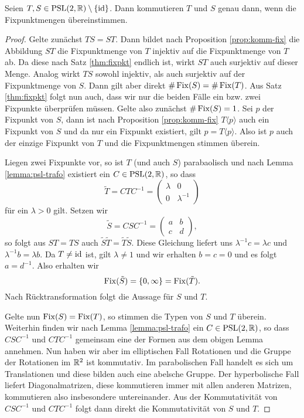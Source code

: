 \begin{thm}
  \label{thm:komm-fix}
  Seien $T,S \in \operatorname{PSL}(2, \mathbb{R})\setminus \{\operatorname{id}\}$. Dann kommutieren $T$ und $S$ genau dann,
  wenn die Fixpunktmengen übereinstimmen.
\end{thm}

\begin{proof}
  Gelte zunächst $TS = ST$. Dann bildet nach Proposition
  \ref{prop:komm-fix} die Abbildung $ST$ die Fixpunktmenge von $T$
  injektiv auf die Fixpunktmenge von $T$ ab. Da diese nach Satz
  \ref{thm:fixpkt} endlich ist, wirkt $ST$ auch surjektiv auf dieser
  Menge. Analog wirkt $TS$ sowohl injektiv, als auch surjektiv auf der
  Fixpunktmenge von $S$. Dann gilt aber direkt $\# \operatorname{Fix}(S) = \#
  \operatorname{Fix}(T)$. Aus Satz \ref{thm:fixpkt} folgt nun auch, dass wir nur die
  beiden Fälle ein bzw. zwei Fixpunkte überprüfen müssen. Gelte also
  zunächst $\# \operatorname{Fix}(S) = 1$. Sei $p$ der Fixpunkt von $S$, dann ist
  nach Proposition \ref{prop:komm-fix} $T\langle p \rangle$ auch ein
  Fixpunkt von $S$ und da nur ein Fixpunkt existiert, gilt $ p = T
  \langle p \rangle$. Also ist $p$ auch der einzige Fixpunkt von $T$
  und die Fixpunktmengen stimmen überein.

  Liegen zwei Fixpunkte vor, so ist $T$ (und auch
  $S$) parabaolisch und nach Lemma \ref{lemma:psl-trafo} existiert ein
  $C \in \operatorname{PSL}(2,\mathbb{R})$, so dass
  \[
  \tilde T = C T C^{-1} =
  \begin{pmatrix}
    \lambda & 0 \\
    0 & \lambda^{-1}
  \end{pmatrix}
  \]
  für ein $\lambda > 0$ gilt. Setzen wir
  \[
  \tilde S = C S C^{-1} =
  \begin{pmatrix}
    a & b \\
    c & d
  \end{pmatrix},
  \]
  so folgt aus $ST = TS$ auch $\tilde S \tilde T = \tilde T \tilde
  S$. Diese Gleichung liefert uns $\lambda^{-1} c = \lambda c$ und
  $\lambda^{-1} b = \lambda b$. Da $T \neq \operatorname{id}$ ist, gilt $\lambda \neq 1$ und
  wir erhalten $b = c = 0$ und es folgt $a = d^{-1}$. Also
  erhalten wir
  \[
  \operatorname{Fix}(\tilde S) = \{0, \infty\} = \operatorname{Fix}(\tilde T).
  \]
  Nach Rücktransformation folgt die Aussage für $S$ und $T$.

  Gelte nun $\operatorname{Fix}(S) = \operatorname{Fix}(T)$, so stimmen die Typen von $S$ und $T$
  überein. Weiterhin finden wir nach Lemma \ref{lemma:psl-trafo} ein $C
  \in \operatorname{PSL}(2, \mathbb{R})$, so dass $C S C^{-1}$ und $C T C^{-1}$ gemeinsam
  eine der Formen aus dem obigen Lemma annehmen. Nun haben wir aber im
  elliptischen Fall Rotationen und die Gruppe der Rotationen im $\mathbb{R}^2$
  ist kommutativ. Im parabolischen Fall handelt es sich um
  Translationen und diese bilden auch eine abelsche Gruppe. Der
  hyperbolische Fall liefert Diagonalmatrizen, diese kommutieren immer
  mit allen anderen Matrizen, kommutieren also insbesondere
  untereinander. Aus der Kommutativität von $C S C^{-1}$ und $C T
  C^{-1}$ folgt dann direkt die Kommutativität von $S$ und $T$.
\end{proof}

